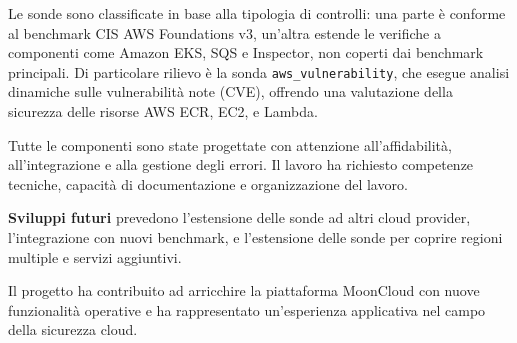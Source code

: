 \documentclass[11pt,a4paper]{article}
\begin{document}
Le sonde sono classificate in base alla tipologia di controlli: una parte è conforme al benchmark CIS AWS Foundations v3, un'altra estende le verifiche a componenti come Amazon EKS, SQS e Inspector, non coperti dai benchmark principali. Di particolare rilievo è la sonda \texttt{aws\_vulnerability}, che esegue analisi dinamiche sulle vulnerabilità note (CVE), offrendo una valutazione della sicurezza delle risorse AWS ECR, EC2, e Lambda. 

Tutte le componenti sono state progettate con attenzione all'affidabilità, all'integrazione e alla gestione degli errori. Il lavoro ha richiesto competenze tecniche, capacità di documentazione e organizzazione del lavoro.

\vspace{1em}

\noindent
\textbf{Sviluppi futuri} prevedono l'estensione delle sonde ad altri cloud provider, l'integrazione con nuovi benchmark, e l'estensione delle sonde per coprire regioni multiple e servizi aggiuntivi.  
\vspace{1em}

Il progetto ha contribuito ad arricchire la piattaforma MoonCloud con nuove funzionalità operative e ha rappresentato un'esperienza applicativa nel campo della sicurezza cloud.
\end{document}
